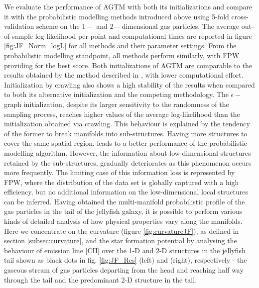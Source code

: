 We evaluate the performance of AGTM with both its initializations and compare it with the probabilistic modelling methods introduced above
using 5-fold cross-validation scheme on the $1-$ and $2-$dimensional gas particles.
The average out-of-sample log-likelihood per point and computational times are reported in figure \ref{fig:JF_Norm_logL} for all methods and their parameter settings. From the probabilistic modelling standpoint, all methods perform similarly, with FPW providing for the best score. Both initializations of AGTM are comparable to the results obtained by the method described in \cite{990138}, with lower computational effort.
Initialization by crawling also shows a high stability of the results when compared to both its alternative initialization and the competing methodology. The $\epsilon-$graph initialization, despite its larger sensitivity to the randomness of the sampling process, reaches higher values of the average log-likelihood than the initialization obtained via crawling. This behaviour is explained by the tendency of the former to break manifolds into sub-structures. Having more structures to cover the same spatial region, leads to a better performance of the probabilistic modelling algorithm. However, the information about low-dimensional structures retained by the sub-structures, gradually deteriorates as this phenomenon occurs more frequently. The limiting case of this information loss is represented by FPW, where the distribution of the data set is globally captured with a high efficiency, but no additional information on the low-dimensional local structures can be inferred.
Having obtained the multi-manifold probabilistic profile of the gas particles in the tail of the jellyfish galaxy, it is possible to perform various kinds of detailed analysis of how physical properties vary along the manifolds.
Here we concentrate on the curvature (figure \ref{fig:curvatureJF}), as defined in section \ref{subsec:curvature}, and the star formation potential by analysing the behaviour of emission line [CII] over the 1-D and 2-D structures in the jellyfish tail shown as black dots in fig. \ref{fig:JF_Res} (left) and (right), respectively - the gaseous stream of gas particles departing from the head and reaching half way through the tail and the predominant 2-D structure in the tail.
